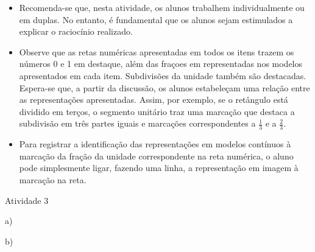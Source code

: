 \documentclass[oneside]{book}
\begin{document}
\begin{multicols}{2}
\begin{itemize} %
    \item       Recomenda-se que, nesta atividade, os alunos trabalhem individualmente ou em duplas. No entanto, é fundamental que os alunos sejam estimulados a explicar o raciocínio realizado.
    \item       Observe que as retas numéricas apresentadas em todos os itens trazem os números 0 e 1 em destaque, além das fraçoes em representadas nos modelos apresentados em cada item. Subdivisões da unidade também são destacadas. Espera-se que, a partir da discussão, os alunos estabeleçam uma relação entre as representações apresentadas. Assim, por exemplo, se o retângulo está dividido em terços, o segmento unitário traz uma marcação que destaca a subdivisão em três partes iguais e marcações correspondentes a       $\frac{1}{3}$       e a       $\frac{2}{3}$. 
    \item       Para registrar a identificação das representações em modelos contínuos à marcação da fração da unidade correspondente na reta numérica, o aluno pode simplesmente ligar, fazendo uma linha, a representação em imagem à marcação na reta.
\end{itemize} %
  
  


\begin{resposta*} {Atividade 3}
 
a) 
 
\vspace{.3cm}
 
b)
 
\end{resposta*}
\end{multicols}
\end{document}

